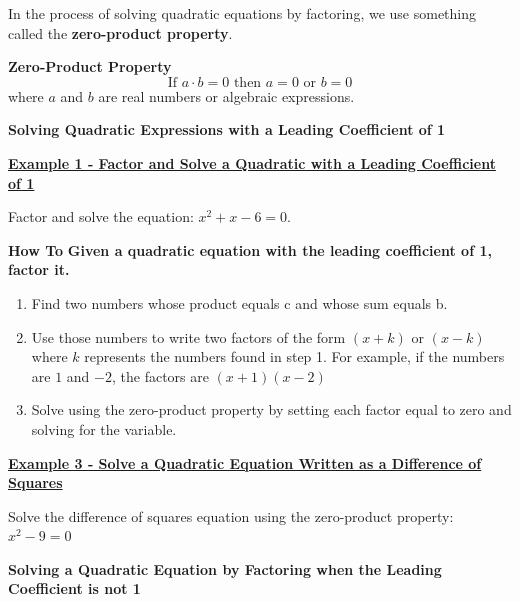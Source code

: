 \documentclass[12pt]{book}
\begin{document}
In the process of solving quadratic equations by factoring, we use something called the \textbf{zero-product property}.
\vspace{3mm}
    \begin{boxR}
     \textbf{Zero-Product Property}
    \vspace{1mm}
    \hline
    \vspace{2mm}
    $$ \text{If } a \cdot b = 0 \text{ then } a=0 \text{ or } b=0$$
     where $a$ and $b$ are real numbers or algebraic expressions.  
\end{boxR}
\vspace{3mm}

\textbf{Solving Quadratic Expressions with a Leading Coefficient of 1}
\vspace{3mm}

\underline{\textbf{Example 1 - Factor and Solve a Quadratic with a Leading Coefficient of 1}}

Factor and solve the equation: $x^2 + x -6 = 0$.

\newpage

\vspace{3mm}
    \begin{boxR}
     \textbf{How To}
    \vspace{1mm}
    \hline
    \vspace{2mm}
  \textbf{Given a quadratic equation with the leading coefficient of 1, factor it.} 
  \begin{enumerate}
      \item Find two numbers whose product equals c and whose sum equals b.
      \item Use those numbers to write two factors of the form $(x+k)$ or $(x-k)$ where $k$ represents the numbers found in step 1. For example, if the numbers are $1$ and $-2$, the factors are $(x+1)(x-2)$
      \item Solve using the zero-product property by setting each factor equal to zero and solving for the variable.
  \end{enumerate}
\end{boxR}
\vspace{3mm}


\underline{\textbf{Example 3 - Solve a Quadratic Equation Written as a Difference of Squares}}

Solve the difference of squares equation using the zero-product property:  $x^2-9=0$

\vspace{50mm}
\textbf{Solving a Quadratic Equation by Factoring when the Leading Coefficient is not 1}
\end{document}
